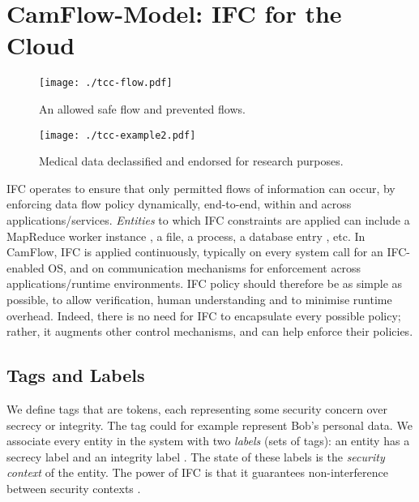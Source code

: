 \documentclass[10pt,journal,compsoc]{IEEEtran}
\begin{document}
 

\section{CamFlow-Model: IFC for the Cloud}
\label{sec:model}


\begin{figure}[!t]
\centering
  \texttt{[image: ./tcc-flow.pdf]}
  \caption{An allowed safe flow and prevented flows.} 
  \label{image:model:flow}
\end{figure}

\begin{figure*}[!t]
\centering
  \texttt{[image: ./tcc-example2.pdf]}
  \caption{Medical data declassified and endorsed for research purposes.}
  \label{image:declass}
\end{figure*} 



IFC operates to ensure that only permitted flows of information can occur, by enforcing data flow policy dynamically, end-to-end, within and across applications\slash services.
\emph{Entities} to which IFC constraints are
applied can include 
a MapReduce worker instance \cite{akoush14mrlazy}, a file, a process, a database entry \cite{Schultz:2013:IDI:2465351.2465357}, etc.
In CamFlow, IFC is applied continuously, typically on every system call for an IFC-enabled OS, and on communication mechanisms for enforcement across applications\slash runtime environments. IFC policy should therefore be as simple as possible, to allow verification, human understanding and to minimise runtime overhead.
Indeed, there is no need for IFC to encapsulate every possible policy; rather, it augments other control mechanisms, and can help enforce their policies.

\subsection{Tags and Labels}
\label{sec:ifc:tags}





We define tags that are tokens, each representing some security concern over secrecy or integrity. The tag  could for example represent Bob's personal data. We associate every entity in the system with two {\em labels} (sets of tags): an entity  has a secrecy label  and an integrity label . The state of these labels is the \emph{security context} of the entity.
The power of IFC is that it guarantees non-interference between security contexts \cite{von2004information, hedin2011perspective}.
\end{document}
